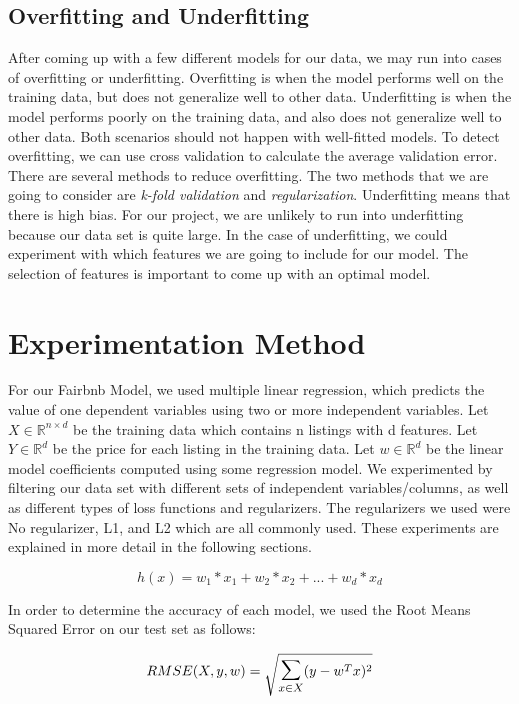\documentclass{article}
\begin{document}
\subsection{Overfitting and Underfitting}
After coming up with a few different models for our data, we may run into cases of overfitting or underfitting. Overfitting is when the model performs well on the training data, but does not generalize well to other data. Underfitting is when the model performs poorly on the training data, and also does not generalize well to other data. Both scenarios should not happen with well-fitted models. To detect overfitting, we can use cross validation to calculate the average validation error. There are several methods to reduce overfitting. The two methods that we are going to consider are \textit{k-fold validation} and \textit{regularization}. Underfitting means that there is high bias. For our project, we are unlikely to run into underfitting because our data set is quite large. In the case of underfitting, we could experiment with which features we are going to include for our model. The selection of features is important to come up with an optimal model.

\section{Experimentation Method}
For our Fairbnb Model, we used multiple linear regression, which predicts the value of one dependent variables using two or more independent variables. Let $X \in \mathds{R}^{n \times d}$ be the training data which contains n listings with d features. Let $Y \in \mathds{R}^{d}$ be the price for each listing in the training data. Let $w \in \mathds{R}^{d}$ be the linear model coefficients computed using some regression model. We experimented by filtering our data set with different sets of independent variables/columns, as well as different types of loss functions and regularizers. The regularizers we used were No regularizer, L1, and L2 which are all commonly used. These experiments are explained in more detail in the following sections.

\begin{equation}
	h(x) = w_1*x_1 + w_2*x_2 + ... + w_d*x_d
\end{equation}

In order to determine the accuracy of each model, we used the Root Means Squared Error on our test set as follows:

\begin{align*}
  RMSE(X,y,w) = \sqrt{\mathlarger{\mathlarger{\sum}}_{x \in X} (y-w^T x)^2}
\end{align*}
\end{document}
